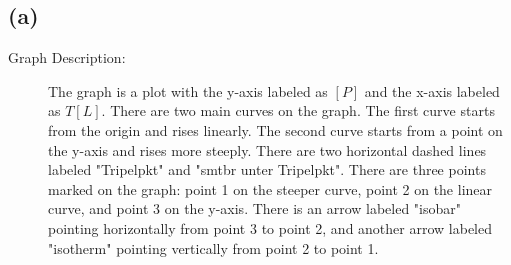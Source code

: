

\subsection*{(a)}

\begin{description}
    \item[Graph Description:] The graph is a plot with the y-axis labeled as $[P]$ and the x-axis labeled as $T [L]$. There are two main curves on the graph. The first curve starts from the origin and rises linearly. The second curve starts from a point on the y-axis and rises more steeply. There are two horizontal dashed lines labeled "Tripelpkt" and "smtbr unter Tripelpkt". There are three points marked on the graph: point 1 on the steeper curve, point 2 on the linear curve, and point 3 on the y-axis. There is an arrow labeled "isobar" pointing horizontally from point 3 to point 2, and another arrow labeled "isotherm" pointing vertically from point 2 to point 1.
\end{description}